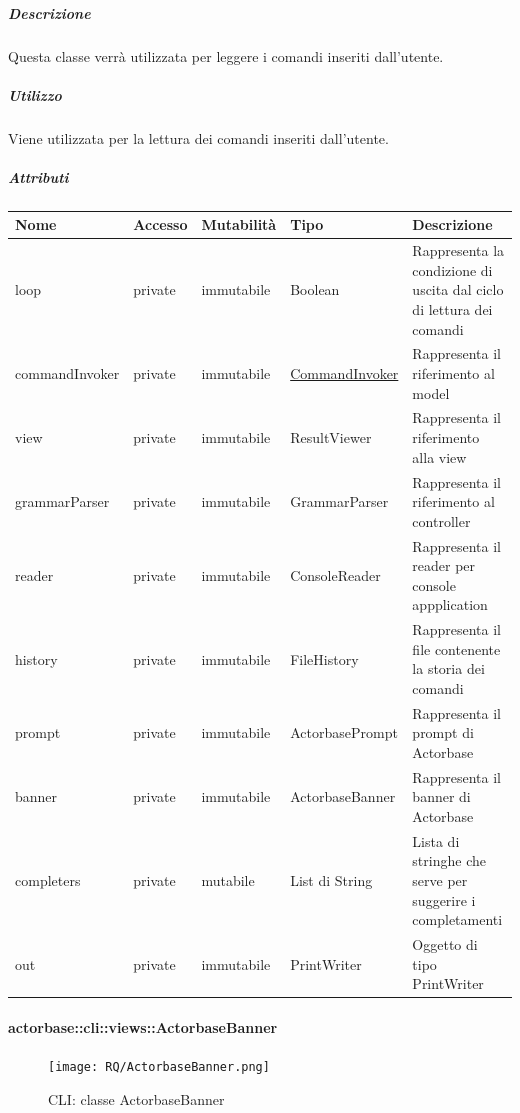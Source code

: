 \documentclass{scalatekids-article}
\begin{document}
\subparagraph{Descrizione}
Questa classe verrà utilizzata per leggere i comandi inseriti dall'utente.

\subparagraph{Utilizzo}
Viene utilizzata per la lettura dei comandi inseriti dall'utente.

\subparagraph{Attributi}
\begin{tabular}{| p{2.7cm} | p{1.5cm} | p{2cm} | p{2.7cm} | p{8cm} |}
  \hline
  Nome & Accesso & Mutabilità & Tipo & Descrizione\\
  \hline
  loop & private & immutabile & Boolean & Rappresenta la condizione di uscita dal ciclo di lettura dei comandi\\
  \hline
  commandInvoker & private & immutabile & \hyperref[sec:actorbase::cli::models::CommandInvoker]{CommandInvoker} & Rappresenta il riferimento al model\\
  \hline
  view & private & immutabile & ResultViewer & Rappresenta il riferimento alla view\\
  \hline
  grammarParser & private & immutabile & GrammarParser & Rappresenta il riferimento al controller\\
  \hline
  reader & private & immutabile & ConsoleReader & Rappresenta il reader per console appplication \\
  \hline
  history & private & immutabile & FileHistory & Rappresenta il file contenente la storia dei comandi\\
  \hline
  prompt & private & immutabile & ActorbasePrompt & Rappresenta il prompt di Actorbase\\
  \hline
  banner & private & immutabile & ActorbaseBanner & Rappresenta il banner di Actorbase\\
  \hline
  completers & private & mutabile & List di String & Lista di stringhe che serve per suggerire i completamenti\\
  \hline
  out & private & immutabile & PrintWriter & Oggetto di tipo PrintWriter\\
  \hline
\end{tabular}

\paragraph{actorbase::cli::views::ActorbaseBanner}
\label{sec:actorbase::cli::views::ActorbaseBanner}

\begin{figure}[H]
  \begin{center}
    \texttt{[image: RQ/ActorbaseBanner.png]}
    \caption{CLI: classe ActorbaseBanner}
  \end{center}
\end{figure}
\end{document}
